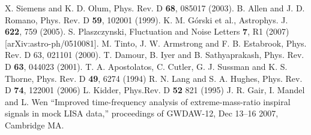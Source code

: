 \documentclass{iopart}
\begin{document}
\begin{thebibliography}{99}
%
 X. Siemens and K. D. Olum, Phys. Rev. D {\bf 68}, 085017 (2003).
%
 B. Allen and J. D. Romano, Phys. Rev. D {\bf 59}, 102001 (1999).
%
 K. M. G\'orski et al., Astrophys. J. {\bf 622}, 759 (2005).
%
 S. Plaszczynski, Fluctuation and Noise Letters {\bf 7}, R1 (2007) [arXiv:astro-ph/0510081].
%
 M. Tinto, J. W. Armstrong and F. B. Estabrook, Phys. Rev. D 63, 021101 (2000).
%
 T. Damour, B. Iyer and B. Sathyaprakash, Phys. Rev. D {\bf 63}, 044023 (2001).
%
 T. A. Apostolatos, C. Cutler, G. J. Sussman and K. S. Thorne, Phys. Rev. D {\bf 49},
6274 (1994)
%
 R. N. Lang and S. A. Hughes, Phys. Rev. D {\bf 74}, 122001 (2006) 
%
 L. Kidder, Phys.Rev. D {\bf 52}  821 (1995)
%
 J. R. Gair, I. Mandel and L. Wen
``Improved time-frequency analysis of extreme-mass-ratio inspiral signals in mock LISA data,'' proceedings of GWDAW-12, Dec 13--16 2007, Cambridge MA.

\end{thebibliography}
\end{document}
